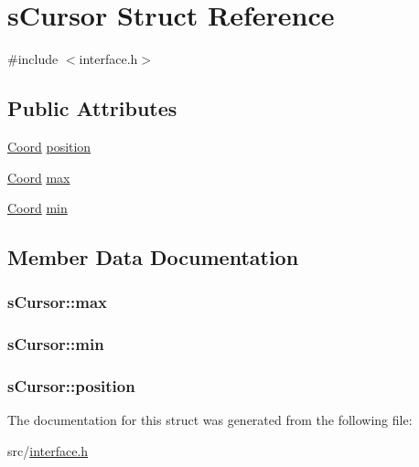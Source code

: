 \hypertarget{structs_cursor}{}\section{s\+Cursor Struct Reference}
\label{structs_cursor}


{\ttfamily \#include $<$interface.\+h$>$}

\subsection*{Public Attributes}
\begin{DoxyCompactItemize}
\item 
\hyperlink{coordonates_8h_aff9d4468ac7a973ce7e5cfb5bd39bc33}{Coord} \hyperlink{structs_cursor_a3da303b3a96ff995ab27655c21b07540}{position}
\item 
\hyperlink{coordonates_8h_aff9d4468ac7a973ce7e5cfb5bd39bc33}{Coord} \hyperlink{structs_cursor_ae109344a745715e12758f771af3bc49e}{max}
\item 
\hyperlink{coordonates_8h_aff9d4468ac7a973ce7e5cfb5bd39bc33}{Coord} \hyperlink{structs_cursor_acecd2c1d0d245bcb270246d5797e9e7c}{min}
\end{DoxyCompactItemize}


\subsection{Member Data Documentation}
\hypertarget{structs_cursor_ae109344a745715e12758f771af3bc49e}{}
\subsubsection[{max}]{ s\+Cursor\+::max}\label{structs_cursor_ae109344a745715e12758f771af3bc49e}
\hypertarget{structs_cursor_acecd2c1d0d245bcb270246d5797e9e7c}{}
\subsubsection[{min}]{ s\+Cursor\+::min}\label{structs_cursor_acecd2c1d0d245bcb270246d5797e9e7c}
\hypertarget{structs_cursor_a3da303b3a96ff995ab27655c21b07540}{}
\subsubsection[{position}]{ s\+Cursor\+::position}\label{structs_cursor_a3da303b3a96ff995ab27655c21b07540}


The documentation for this struct was generated from the following file\+:\begin{DoxyCompactItemize}
\item 
src/\hyperlink{interface_8h}{interface.\+h}\end{DoxyCompactItemize}
